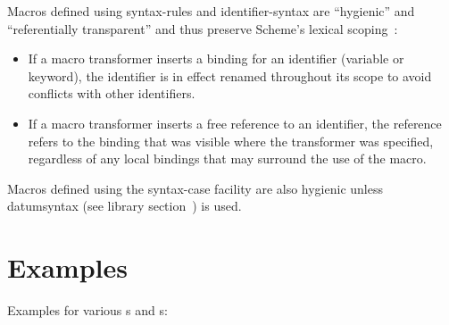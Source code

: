 Macros defined using {\cf syntax-rules} and {\cf identifier-syntax}
are ``hygienic'' and ``referentially transparent'' and thus preserve
Scheme's lexical scoping~\cite{Kohlbecker86,
  hygienic,Bawden88,macrosthatwork,syntacticabstraction}:
 

\begin{itemize}
\item If a macro transformer inserts a binding for an identifier
(variable or keyword), the identifier is in effect renamed
throughout its scope to avoid conflicts with other identifiers.

\item If a macro transformer inserts a free reference to an
identifier, the reference refers to the binding that was visible
where the transformer was specified, regardless of any local
bindings that may surround the use of the macro.
\end{itemize}

Macros defined using the {\cf syntax-case} facility are also
hygienic unless {\cf datum\coerce{}syntax}
(see library section~) is used.

\section{Examples}

Examples for various s and s:

